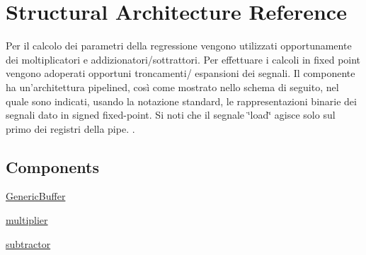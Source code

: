 \hypertarget{class_linear_regression_1_1_structural}{\section{Structural Architecture Reference}
\label{class_linear_regression_1_1_structural}
}


Per il calcolo dei parametri della regressione vengono utilizzati opportunamente dei moltiplicatori e addizionatori/sottrattori. Per effettuare i calcoli in fixed point vengono adoperati opportuni troncamenti/ espansioni dei segnali. Il componente ha un'architettura pipelined, così come mostrato nello schema di seguito, nel quale sono indicati, usando la notazione standard, le rappresentazioni binarie dei segnali dato in signed fixed-\/point. Si noti che il segnale \char`\"{}load\char`\"{} agisce solo sul primo dei registri della pipe. .  


\subsection*{Components}
 \begin{DoxyCompactItemize}
\item 
\hyperlink{group___linear_regression_ga26754353fa942392a9799290b42c41c7}{Generic\+Buffer}  {\bfseries }  
\item 
\hyperlink{group___linear_regression_ga3cf9cbfc3e637ae0660c32ceef50386f}{multiplier}  {\bfseries }  
\item 
\hyperlink{group___linear_regression_ga11e2a27abb1e6d6d48bbaae0f5de7aeb}{subtractor}  {\bfseries }  
\end{DoxyCompactItemize}
